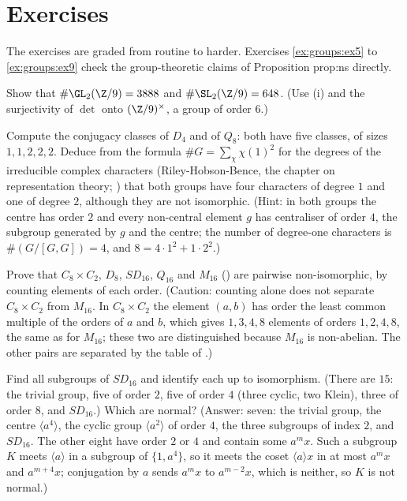 \section{Exercises}\label{sec:groups:exercises}

The exercises are graded from routine to harder. Exercises \ref{ex:groups:ex5} to \ref{ex:groups:ex9} check the group-theoretic claims of Proposition prop:ns
directly.

\begin{exercise}\label{ex:groups:ex1}
Show that $\#\GL_2(\Z/9)=3888$ and $\#\SL_2(\Z/9)=648$. (Use (i) and the surjectivity of $\det$ onto $(\Z/9)^\times$, a group of order $6$.)
\end{exercise}

\begin{exercise}\label{ex:groups:ex2}
Compute the conjugacy classes of $D_4$ and of $Q_8$: both have five classes, of sizes $1,1,2,2,2$. Deduce from the formula $\#G=\sum_\chi\chi(1)^2$ for the
degrees of the irreducible complex characters (Riley-Hobson-Bence, the chapter on representation theory; ) that both groups have four characters of degree $1$ and one of
degree $2$, although they are not isomorphic.
(Hint: in both groups the centre has order $2$ and every non-central element $g$ has centraliser of order $4$, the subgroup generated by $g$ and the centre;
the number of degree-one characters is $\#(G/[G,G])=4$, and $8=4\cdot1^2+1\cdot2^2$.)
\end{exercise}

\begin{exercise}\label{ex:groups:ex3}
Prove that $C_8\times C_2$, $D_8$, $SD_{16}$, $Q_{16}$ and $M_{16}$ () are pairwise non-isomorphic, by counting elements of each order.
(Caution: counting alone does not separate $C_8\times C_2$ from $M_{16}$. In $C_8\times C_2$ the element $(a,b)$ has order the least common multiple of the orders
of $a$ and $b$, which gives $1,3,4,8$ elements of orders $1,2,4,8$, the same as for $M_{16}$; these two are distinguished because $M_{16}$ is non-abelian.
The other pairs are separated by the table of .)
\end{exercise}

\begin{exercise}\label{ex:groups:ex4}
Find all subgroups of $SD_{16}$ and identify each up to isomorphism. (There are $15$: the trivial group, five of order $2$, five of order $4$ (three cyclic, two
Klein), three of order $8$, and $SD_{16}$.) Which are normal? (Answer: seven: the trivial group, the centre $\langle a^4\rangle$, the cyclic group $\langle a^2\rangle$ of
order $4$, the three subgroups of index $2$, and $SD_{16}$. The other eight have order $2$ or $4$ and contain some $a^mx$. Such a
subgroup $K$ meets $\langle a\rangle$ in a subgroup of $\{1,a^4\}$, so it meets the coset $\langle a\rangle x$ in at most $a^mx$ and $a^{m+4}x$; conjugation by $a$ sends $a^mx$ to
$a^{m-2}x$, which is neither, so $K$ is not normal.)
\end{exercise}

